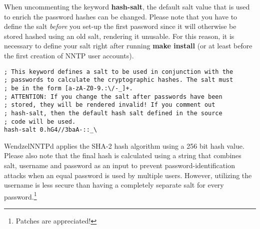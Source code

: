 When uncommenting the keyword \textbf{hash-salt}, the default salt value that is used to enrich the password hashes can be changed. Please note that you have to define the salt \textit{before} you set-up the first password since it will otherwise be stored hashed using an old salt, rendering it unusable. For this reason, it is necessary to define your salt right after running \textbf{make install} (or at least before the first creation of NNTP user accounts).

\begin{verbatim}
; This keyword defines a salt to be used in conjunction with the
; passwords to calculate the cryptographic hashes. The salt must
; be in the form [a-zA-Z0-9.:\/-_]+.
; ATTENTION: If you change the salt after passwords have been
; stored, they will be rendered invalid! If you comment out
; hash-salt, then the default hash salt defined in the source
; code will be used.
hash-salt 0.hG4//3baA-::_\
\end{verbatim}

WendzelNNTPd applies the SHA-2 hash algorithm using a 256 bit hash value. Please also note that the final hash is calculated using a string that combines salt, username and password as an input to prevent password-identification attacks when an equal password is used by multiple users. However, utilizing the username is less secure than having a completely separate salt for every password.\footnote{Patches are appreciated!}


